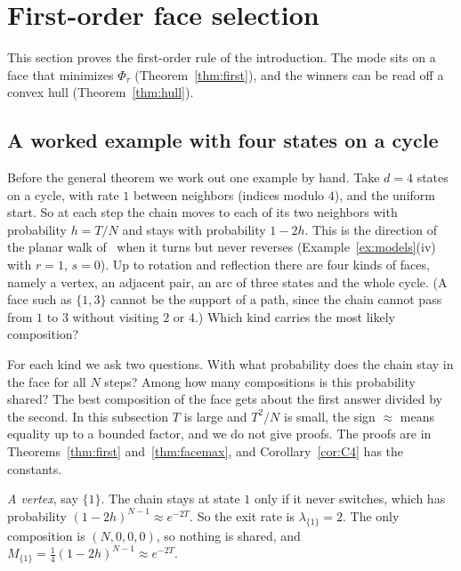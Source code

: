 \section{First-order face selection}\label{sec:firstorder}

This section proves the first-order rule of the introduction. The mode sits on a face that
minimizes $\Phi_\tau$ (Theorem~\ref{thm:first}), and the winners can be read off a convex hull
(Theorem~\ref{thm:hull}).

\subsection{A worked example with four states on a cycle}\label{sec:worked}

Before the general theorem we work out one example by hand. Take $d=4$ states
on a cycle, with rate $1$ between neighbors (indices modulo $4$), and the
uniform start. So at each step the chain moves to each of its two neighbors with
probability $h=T/N$ and stays with probability $1-2h$. This is the direction of
the planar walk of~\cite{paperE} when it turns but never reverses
(Example~\ref{ex:models}(iv) with $r=1$, $s=0$). Up to rotation and reflection
there are four kinds of faces, namely a vertex, an adjacent pair, an arc of
three states and the whole cycle. (A face such as $\{1,3\}$ cannot be the
support of a path, since the chain cannot pass from $1$ to $3$ without visiting
$2$ or $4$.) Which kind carries the most likely composition?

For each kind we ask two questions. With what probability does the chain stay
in the face for all $N$ steps? Among how many compositions is this probability
shared? The best composition of the face gets about the first answer divided by
the second. In this subsection $T$ is large and $T^2/N$ is small, the sign
$\approx$ means equality up to a bounded factor, and we do not give proofs.
The proofs are in Theorems~\ref{thm:first} and~\ref{thm:facemax}, and
Corollary~\ref{cor:C4} has the constants.

\emph{A vertex}, say $\{1\}$. The chain stays at state $1$ only if it never
switches, which has probability $(1-2h)^{N-1}\approx e^{-2T}$. So the exit rate
is $\lambda_{\{1\}}=2$. The only composition is $(N,0,0,0)$, so nothing is
shared, and $M_{\{1\}}=\frac14(1-2h)^{N-1}\approx e^{-2T}$.

